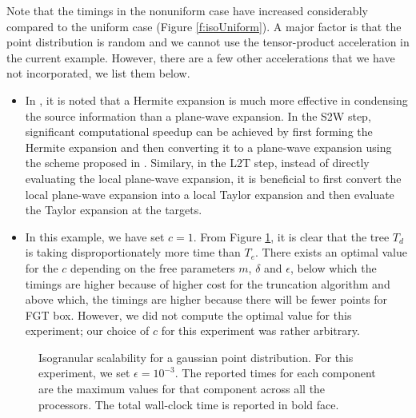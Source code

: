 Note that the timings in the nonuniform case have increased considerably compared to the uniform case (Figure \ref{f:isoUniform}). A 
major factor is that the point distribution is random and we cannot use the tensor-product acceleration in the current example. However,
 there are a few other accelerations that we have not incorporated, we list them below.
%
\begin{itemize}
  \item In \cite{fggt}, it is noted that a Hermite expansion is much more effective in condensing the source information than a plane-wave
   expansion. In the S2W step, significant computational speedup can be achieved by first forming the Hermite expansion and then converting 
   it to a plane-wave expansion using the scheme proposed in \cite{fggt}. Similary, in the L2T step, instead of directly evaluating the 
   local plane-wave expansion, it is beneficial to first convert the local plane-wave expansion into a local Taylor expansion and then evaluate 
   the Taylor expansion at the targets. 
  \item In this example, we have set $c = 1$. From Figure \ref{f:isoGaussian}, it is clear that the tree $T_d$ is taking disproportionately 
  more time than $T_e$. There exists an optimal value for the $c$ depending on the free parameters $m$, $\delta$ and $\epsilon$, below which
 the timings are higher because of higher cost for the truncation algorithm and above which, the timings are higher because
 there will be fewer points for FGT box. However, we did not compute the optimal value for this experiment; our choice of $c$ for this experiment
 was rather arbitrary.
\end{itemize}


\begin{figure}
	\begin{center}
	
	\end{center}
\caption{\label{f:isoGaussian} Isogranular scalability for a gaussian point distribution. For
 this experiment, we set $\epsilon = 10^{-3}$. The reported times for each component are the
 maximum values for that component across all the processors. The total wall-clock
time is reported in bold face.} 
\end{figure}
